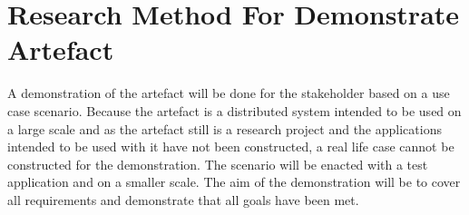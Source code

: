 \section{Research Method For Demonstrate Artefact}
A demonstration of the artefact will be done for the stakeholder based on a use case scenario. Because the artefact is a distributed system intended to be used on a large scale and as the artefact still is a research project and the applications intended to be used with it have not been constructed, a real life case cannot be constructed for the demonstration. The scenario will be enacted with a test application and on a smaller scale. The aim of the demonstration will be to cover all requirements and demonstrate that all goals have been met.  
